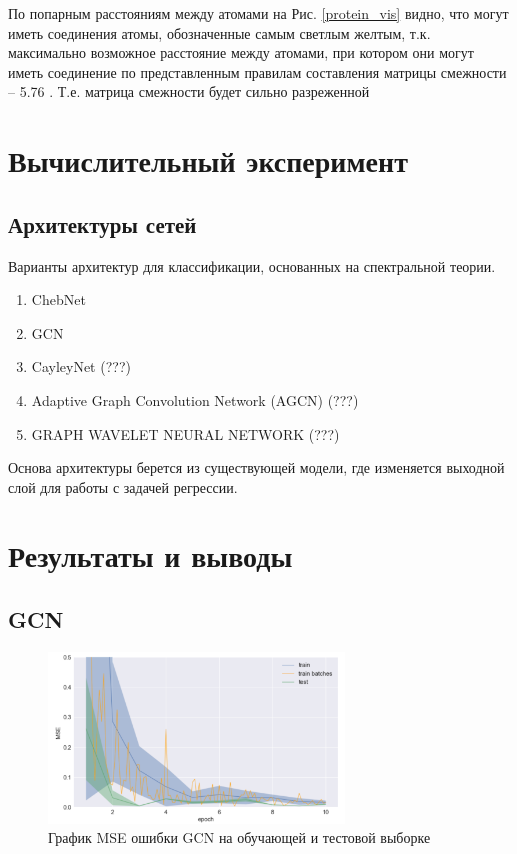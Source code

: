 \documentclass[12pt,twosides]{article}
\begin{document}
	По попарным расстояниям между атомами на Рис. \ref{protein_vis} видно, что могут иметь соединения атомы, обозначенные самым светлым желтым, т.к. максимально возможное расстояние между атомами, при котором они могут иметь соединение по представленным правилам составления матрицы смежности -- 5.76 . Т.е. матрица смежности будет сильно разреженной
	
	\section{Вычислительный эксперимент}
		
	
	\subsection{Архитектуры сетей}
	Варианты архитектур для классификации, основанных на спектральной теории.
	\begin{enumerate}
		\item ChebNet \cite{NIPS2016_6081}
		\item GCN \cite{kipf_semi-supervised_2017}
		\item CayleyNet (???) 
		\item Adaptive Graph Convolution Network (AGCN) (???) 
		\item GRAPH WAVELET NEURAL NETWORK (???) 
	\end{enumerate}
	
	Основа архитектуры берется из существующей модели, где изменяется выходной слой для работы с задачей регрессии.
	
	\section{Результаты и выводы}
	
	\subsection{GCN}
		\begin{figure}[H]
		\centering
		\includegraphics[width=0.7\textwidth]{gcn_mse_res.pdf}
		\caption{График MSE ошибки GCN на обучающей и тестовой выборке}
		\label{GCN}
	\end{figure}
\end{document}
